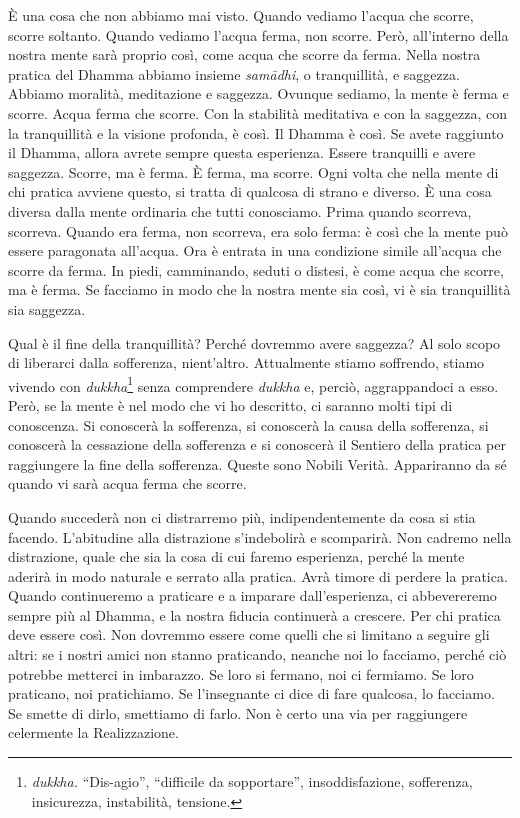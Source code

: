 È una cosa che non abbiamo mai visto. Quando vediamo l'acqua che scorre,
scorre soltanto. Quando vediamo l'acqua ferma, non scorre. Però,
all'interno della nostra mente sarà proprio così, come acqua che scorre
da ferma. Nella nostra pratica del Dhamma abbiamo insieme
\emph{samādhi}, o tranquillità, e saggezza. Abbiamo moralità,
meditazione e saggezza. Ovunque sediamo, la mente è ferma e scorre.
Acqua ferma che scorre. Con la stabilità meditativa e con la saggezza,
con la tranquillità e la visione profonda, è così. Il Dhamma è così. Se
avete raggiunto il Dhamma, allora avrete sempre questa esperienza.
Essere tranquilli e avere saggezza. Scorre, ma è ferma. È ferma, ma
scorre. Ogni volta che nella mente di chi pratica avviene questo, si
tratta di qualcosa di strano e diverso. È una cosa diversa dalla mente
ordinaria che tutti conosciamo. Prima quando scorreva, scorreva. Quando
era ferma, non scorreva, era solo ferma: è così che la mente può essere
paragonata all'acqua. Ora è entrata in una condizione simile all'acqua
che scorre da ferma. In piedi, camminando, seduti o distesi, è come
acqua che scorre, ma è ferma. Se facciamo in modo che la nostra mente
sia così, vi è sia tranquillità sia saggezza.

Qual è il fine della tranquillità? Perché dovremmo avere saggezza? Al
solo scopo di liberarci dalla sofferenza, nient'altro. Attualmente
stiamo soffrendo, stiamo vivendo con \emph{dukkha}\footnote{\emph{dukkha.}
  ``Dis-agio'', ``difficile da sopportare'', insoddisfazione,
  sofferenza, insicurezza, instabilità, tensione.} senza comprendere
\emph{dukkha} e, perciò, aggrappandoci a esso. Però, se la mente è nel
modo che vi ho descritto, ci saranno molti tipi di conoscenza. Si
conoscerà la sofferenza, si conoscerà la causa della sofferenza, si
conoscerà la cessazione della sofferenza e si conoscerà il Sentiero
della pratica per raggiungere la fine della sofferenza. Queste sono
Nobili Verità. Appariranno da sé quando vi sarà acqua ferma che scorre.

Quando succederà non ci distrarremo più, indipendentemente da cosa si
stia facendo. L'abitudine alla distrazione s'indebolirà e scomparirà.
Non cadremo nella distrazione, quale che sia la cosa di cui faremo
esperienza, perché la mente aderirà in modo naturale e serrato alla
pratica. Avrà timore di perdere la pratica. Quando continueremo a
praticare e a imparare dall'esperienza, ci abbevereremo sempre più al
Dhamma, e la nostra fiducia continuerà a crescere. Per chi pratica deve
essere così. Non dovremmo essere come quelli che si limitano a seguire
gli altri: se i nostri amici non stanno praticando, neanche noi lo
facciamo, perché ciò potrebbe metterci in imbarazzo. Se loro si fermano,
noi ci fermiamo. Se loro praticano, noi pratichiamo. Se l'insegnante ci
dice di fare qualcosa, lo facciamo. Se smette di dirlo, smettiamo di
farlo. Non è certo una via per raggiungere celermente la Realizzazione.

